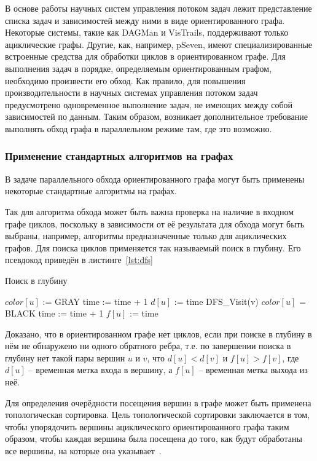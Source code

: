 В основе работы научных систем управления потоком задач лежит представление списка задач и зависимостей между ними в виде ориентированного графа. Некоторые системы, такие как DAGMan\cite{DAGMan2023} и VisTrails\cite{VTDoc2016}, поддерживают только ациклические графы. Другие, как, например, pSeven\cite{pSevenDocsConditons2022}, имеют специализированные встроенные средства для обработки циклов в ориентированном графе. Для выполнения задач в порядке, определяемым ориентированным графом, необходимо произвести его обход. Как правило, для повышения производительности в научных системах управления потоком задач предусмотрено одновременное выполнение задач, не имеющих между собой зависимостей по данным. Таким образом, возникает дополнительное требование выполнять обход графа в параллельном режиме там, где это возможно.

\subsubsection{Применение стандартных алгоритмов на графах}
В задаче параллельного обхода ориентированного графа могут быть применены некоторые стандартные алгоритмы на графах.

Так для алгоритма обхода может быть важна проверка на наличие в входном графе циклов, поскольку в зависимости от её результата для обхода могут быть выбраны, например, алгоритмы предназначенные только для ациклических графов. Для поиска циклов применяется так называемый поиск в глубину. Его псевдокод приведён в листинге~\ref{lst:dfs}
\begin{algorithm}[H]
	\caption{Поиск в глубину}\label{lst:dfs}
	\begin{algorithmic}[1]
		\State $color[u]$ := GRAY
		\State time := time + 1
		\State $d[u]$ := time 
		\State DFS_Visit(v)
		\EndIf
		\EndFor
		\State $color[u]$ = BLACK
		\State time := time + 1
		\State $f[u]$ := time 
		\EndProcedure
	\end{algorithmic}
\end{algorithm}
Доказано\cite{Cormen2005}, что в ориентированном графе нет циклов, если при поиске в глубину в нём не обнаружено ни одного обратного ребра, т.е. по завершении поиска в глубину нет такой пары вершин $u$ и $v$, что $d[u]<d[v]$ и $f[u]>f[v]$, где $d[u]$ -- временная метка входа в вершину, а $f[u]$ -- временная метка выхода из неё.

Для определения очерёдности посещения вершин в графе может быть применена топологическая сортировка. Цель топологической сортировки заключается в том, чтобы упорядочить вершины ациклического ориентированного графа таким образом, чтобы каждая вершина была посещена до того, как будут обработаны все вершины, на которые она указывает~\cite{Sedge2002}.

\noteattributes{}
